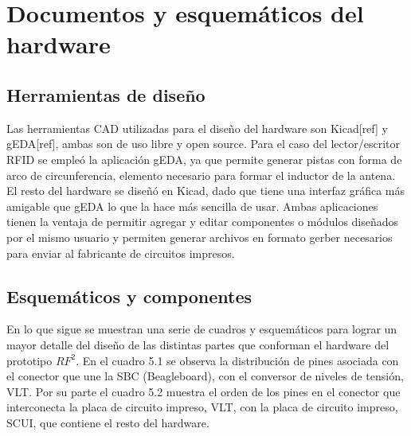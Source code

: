 \chapter{Documentos y esquemáticos del hardware}

\section{Herramientas de diseño}
Las herramientas CAD utilizadas para el diseño del hardware son Kicad[ref] y gEDA[ref], ambas son 
de uso libre y open source.
Para el caso del lector/escritor RFID se empleó la aplicación gEDA, ya que permite generar 
pistas con forma de arco de circunferencia, elemento necesario para formar el inductor de la antena. 
El resto del hardware se diseñó en Kicad, dado que tiene una interfaz gráfica más amigable que gEDA lo que la hace más sencilla de usar.
Ambas aplicaciones tienen la ventaja de permitir agregar y editar componentes
o módulos diseñados por el mismo usuario y permiten generar archivos en formato
gerber necesarios para enviar al fabricante de circuitos impresos.


\section{Esquemáticos y componentes}

En lo que sigue se muestran una serie de cuadros y esquemáticos para lograr un 
mayor detalle del diseño de las distintas partes que conforman el hardware
del prototipo $RF^{2}$.
En el cuadro 5.1 se observa la distribución de pines asociada con el conector
que une la SBC (Beagleboard), con el conversor de niveles de tensión, VLT.
Por su parte el cuadro 5.2 muestra el orden de los pines en el conector que 
interconecta la placa de circuito impreso, VLT, con la placa de circuito
impreso, SCUI, que contiene el resto del hardware. 


